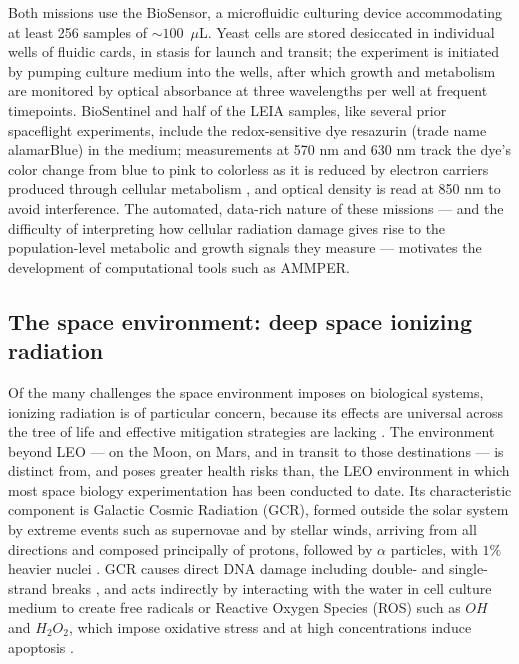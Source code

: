 \documentclass{asmarticle}
\begin{document}
Both missions use the BioSensor, a microfluidic culturing device accommodating at least 256 samples of ${\sim}100$~$\mu$L. Yeast cells are stored desiccated in individual wells of fluidic cards, in stasis for launch and transit; the experiment is initiated by pumping culture medium into the wells, after which growth and metabolism are monitored by optical absorbance at three wavelengths per well at frequent timepoints. BioSentinel and half of the LEIA samples, like several prior spaceflight experiments, include the redox-sensitive dye resazurin (trade name alamarBlue) in the medium; measurements at 570 nm and 630 nm track the dye's color change from blue to pink to colorless as it is reduced by electron carriers produced through cellular metabolism \cite{rampersad2012multiple}, and optical density is read at 850 nm to avoid interference. The automated, data-rich nature of these missions --- and the difficulty of interpreting how cellular radiation damage gives rise to the population-level metabolic and growth signals they measure --- motivates the development of computational tools such as AMMPER.

\subsection{The space environment: deep space ionizing radiation}
Of the many challenges the space environment imposes on biological systems, ionizing radiation is of particular concern, because its effects are universal across the tree of life and effective mitigation strategies are lacking \cite{afshinnekoo2020fundamental,bijlani2021advances}. The environment beyond LEO --- on the Moon, on Mars, and in transit to those destinations --- is distinct from, and poses greater health risks than, the LEO environment in which most space biology experimentation has been conducted to date. Its characteristic component is Galactic Cosmic Radiation (GCR), formed outside the solar system by extreme events such as supernovae and by stellar winds, arriving from all directions and composed principally of protons, followed by $\alpha$ particles, with $1\%$ heavier nuclei \cite{NASA_2023}. GCR causes direct DNA damage including double- and single-strand breaks \cite{NASA}, and acts indirectly by interacting with the water in cell culture medium to create free radicals or Reactive Oxygen Species (ROS) such as $OH$ and $H_2O_2$, which impose oxidative stress and at high concentrations induce apoptosis \cite{borrego2015ionizing, schultzhaus2021transcriptomic, farrugia2012oxidative}.
\end{document}
